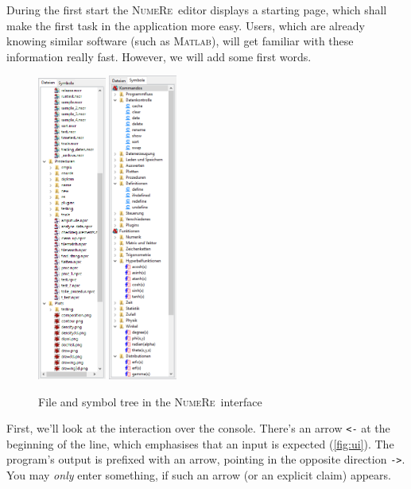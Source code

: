 \documentclass[DIV=14,headsepline,footsepline]{scrbook}
\newcommand{\NR}{\textsc{Nu\-me\-Re}}
\begin{document}
				During the first start the \NR\ editor displays a starting page, which shall make the first task in the application more easy. Users, which are already knowing similar software (such as \textsc{Matlab}), will get familiar with these information really fast. However, we will add some first words.
				\begin{figure}[p]%
					\centering
					\includegraphics[width=0.2\textwidth]{_graphics/filetree.png}\hspace{5em}
					\includegraphics[width=0.2\textwidth]{_graphics/symboltree.png}
					\caption{File and symbol tree in the \NR\ interface}
					\label{fig:trees}
				\end{figure}
				First, we'll look at the interaction over the console. There's an arrow \verb+<-+ at the beginning of the line, which emphasises that an input is expected (\autoref{fig:ui}). The program's output is prefixed with an arrow, pointing in the opposite direction \verb+->+. You may \emph{only} enter something, if such an arrow (or an explicit claim) appears.
				
\end{document}
